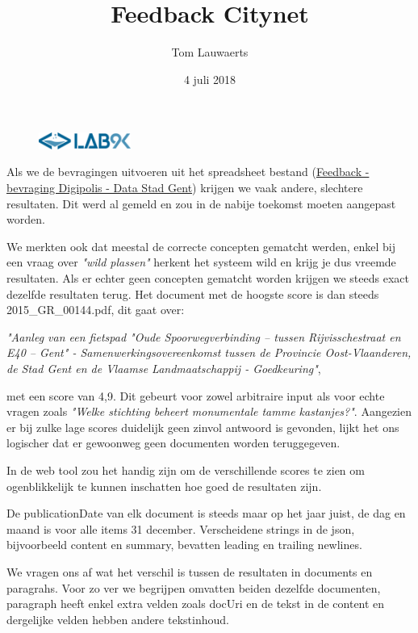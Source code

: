 \documentclass[11pt, letterpaper, oneside]{article}
\title{Feedback Citynet}
\author{Tom Lauwaerts}
\date{4 juli 2018}
\begin{document}
	\begin{figure}
			\includegraphics[width=0.27\textwidth,keepaspectratio]{figuren/logo} %
	\end{figure}
	\vspace*{0.35cm}
	
	\noindent
	\fontsize{30pt}{28pt}\selectfont\textcolor{priColour}{\textbf{\@title}}\newline
	
	\fontsize{11pt}{15pt}\selectfont
	Als we de bevragingen uitvoeren uit het spreadsheet bestand (\href{https://docs.google.com/spreadsheets/d/1eH3B7dC7MSjM5RJHtsiqMeepdzvHi-di5VJLD1ZBV-s/edit#gid=967764322}{Feedback - bevraging Digipolis - Data Stad Gent}) krijgen we vaak andere, slechtere resultaten. Dit werd al gemeld en zou in de nabije toekomst moeten aangepast worden.
	
	We merkten ook dat meestal de correcte concepten gematcht werden, enkel bij een vraag over \textit{"wild plassen"} herkent het systeem wild en krijg je dus vreemde resultaten. Als er echter geen concepten gematcht worden krijgen we steeds exact dezelfde resultaten terug. Het document met de hoogste score is dan steeds 2015\_GR\_00144.pdf, dit gaat over:
	
	\medskip
	\textit{"Aanleg van een fietspad "Oude Spoorwegverbinding – tussen Rijvisschestraat en E40 – Gent" - Samenwerkingsovereenkomst tussen de Provincie Oost-Vlaanderen, de Stad Gent en de Vlaamse Landmaatschappij - Goedkeuring"},
	\medskip
	
	met een score van 4,9. Dit gebeurt voor zowel arbitraire input als voor echte vragen zoals \textit{"Welke stichting beheert monumentale tamme kastanjes?"}. Aangezien er bij zulke lage scores duidelijk geen zinvol antwoord is gevonden, lijkt het ons logischer dat er gewoonweg geen documenten worden teruggegeven.
	
	In de web tool zou het handig zijn om de verschillende scores te zien om ogenblikkelijk te kunnen inschatten hoe goed de resultaten zijn.
	
	De publicationDate van elk document is steeds maar op het jaar juist, de dag en maand is voor alle items 31 december. Verscheidene strings in de json, bijvoorbeeld content en summary, bevatten leading en trailing newlines.
	
	We vragen ons af wat het verschil is tussen de resultaten in documents en paragrahs. Voor zo ver we begrijpen omvatten beiden dezelfde documenten, paragraph heeft enkel extra velden zoals docUri en de tekst in de content en dergelijke velden hebben andere tekstinhoud.
\end{document}
